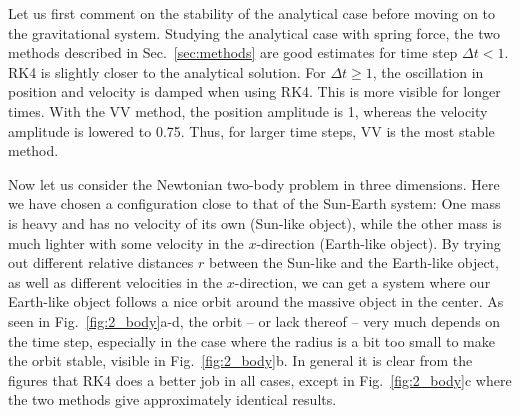 \documentclass{article}
\begin{document}
\begin{multicols}{2}
Let us first comment on the stability of the analytical case before moving on to the gravitational system. Studying the analytical case with spring force, the two methods described in Sec.~\ref{sec:methods} are good estimates for time step $\Delta t<1$. RK4 is slightly closer to the analytical solution. For $\Delta t \geqslant 1$, the oscillation in position and velocity is damped when using RK4. This is more visible for longer times. With the VV method, the position amplitude is 1, whereas the velocity amplitude is lowered to 0.75. Thus, for larger time steps, VV is the most stable method.

Now let us consider the Newtonian two-body problem in three dimensions. Here we have chosen a configuration close to that of the Sun-Earth system: One mass is heavy and has no velocity of its own (Sun-like object), while the other mass is much lighter with some velocity in the $x$-direction (Earth-like object). By trying out different relative distances $r$ between the Sun-like and the Earth-like object, as well as different velocities in the $x$-direction, we can get a system where our Earth-like object follows a nice orbit around the massive object in the center. As seen in Fig.~\ref{fig:2_body}a-d, the orbit -- or lack thereof -- very much depends on the time step, especially in the case where the radius is a bit too small to make the orbit stable, visible in Fig.~\ref{fig:2_body}b. In general it is clear from the figures that RK4 does a better job in all cases, except in Fig.~\ref{fig:2_body}c where the two methods give approximately identical results. 


\end{multicols}
\end{document}
